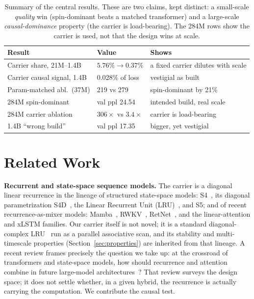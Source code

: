 \documentclass[journal]{IEEEtran}
\begin{document}
\begin{table}[t]\centering\small
\caption{Summary of the central results. These are two claims, kept distinct: a small-scale \emph{quality} win (spin-dominant beats a matched transformer) and a large-scale \emph{causal-dominance} property (the carrier is load-bearing). The 284M rows show the carrier is used, not that the design wins at scale.}
\label{tab:summary}
\begin{tabular}{@{}p{3.6cm} l p{2.6cm}@{}}
\toprule
Result & Value & Shows \\
\midrule
Carrier share, 21M--1.4B & $5.76\% \to 0.37\%$ & a fixed carrier dilutes with scale \\
Carrier causal signal, 1.4B & 0.028\% of loss & vestigial as built \\
Param-matched abl.\ (37M) & 219 vs 279 & spin-dominant by 21\% \\
284M spin-dominant & val ppl 24.54 & intended build, real scale \\
284M carrier ablation & $306\times$ vs $3.4\times$ & carrier is load-bearing \\
1.4B ``wrong build'' & val ppl 17.35 & bigger, yet vestigial \\
\bottomrule
\end{tabular}
\end{table}

\section{Related Work}
\textbf{Recurrent and state-space sequence models.} The carrier is a diagonal linear recurrence in the lineage of structured state-space models: S4~\cite{gu2022s4}, its diagonal parametrization S4D~\cite{gu2022s4d}, the Linear Recurrent Unit (LRU)~\cite{orvieto2023lru}, and S5; and of recent recurrence-as-mixer models: Mamba~\cite{gu2023mamba}, RWKV~\cite{peng2023rwkv}, RetNet~\cite{sun2023retnet}, and the linear-attention and xLSTM families. Our carrier itself is not novel; it is a standard diagonal-complex LRU~\cite{orvieto2023lru,gu2022s4d} run as a parallel associative scan, and its stability and multi-timescale properties (Section~\ref{sec:properties}) are inherited from that lineage. A recent review frames precisely the question we take up: at the crossroad of transformers and state-space models, how should recurrence and attention combine in future large-model architectures~\cite{tiezzi2025recurrent}? That review surveys the design space; it does not settle whether, in a given hybrid, the recurrence is actually carrying the computation. We contribute the causal test.
\end{document}
